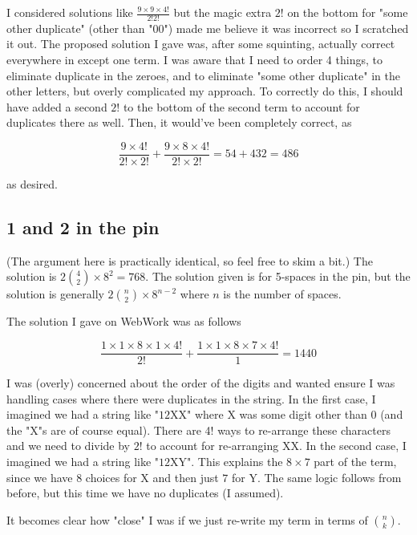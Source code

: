 \documentclass{article}
\begin{document}
I considered solutions like $\frac{9\times9\times4!}{2!2!}$ but the magic extra $2!$ on the bottom for "some other duplicate" (other than "00") made me believe it was incorrect so I scratched it out. The proposed solution I gave was, after some squinting, actually correct everywhere in except one term. I was aware that I need to order 4 things, to eliminate duplicate in the zeroes, and to eliminate "some other duplicate" in the other letters, but overly complicated my approach. To correctly do this, I should have added a second $2!$ to the bottom of the second term to account for duplicates there as well. Then, it would've been completely correct, as

$$\frac{9\times4!}{2!\times2!} + \frac{9\times8\times4!}{2!\times2!}=54+432=486$$

as desired.

\subsection{1 and 2 in the pin}

(The argument here is practically identical, so feel free to skim a bit.) The solution is $2\binom{4}{2} \times 8^2 = 768$. The solution given is for 5-spaces in the pin, but the solution is generally $2\binom{n}{2} \times 8^{n-2}$ where $n$ is the number of spaces.

The solution I gave on WebWork was as follows

$$\frac{1\times1\times8\times1\times4!}{2!} + \frac{1\times1\times8\times7\times4!}{1} = 1440$$

I was (overly) concerned about the order of the digits and wanted ensure I was handling cases where there were duplicates in the string. In the first case, I imagined we had a string like $\text{"12XX"}$ where X was some digit other than 0 (and the "X"s are of course equal). There are 4! ways to re-arrange these characters and we need to divide by $2!$ to account for re-arranging XX. In the second case, I imagined we had a string like $\text{"12XY"}$. This explains the $8\times7$ part of the term, since we have $8$ choices for X and then just $7$ for Y. The same logic follows from before, but this time we have no duplicates (I assumed).

It becomes clear how "close" I was if we just re-write my term in terms of $\binom{n}{k}$.
\end{document}
